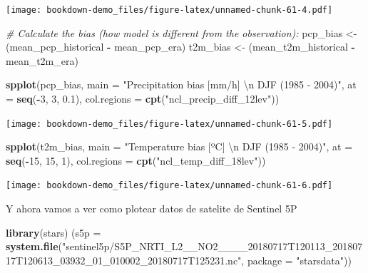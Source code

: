 \documentclass[]{book}
\newenvironment{Shaded}{\begin{snugshade}}{\end{snugshade}}
\newcommand{\CharTok}[1]{\textcolor[rgb]{0.31,0.60,0.02}{#1}}
\newcommand{\CommentTok}[1]{\textcolor[rgb]{0.56,0.35,0.01}{\textit{#1}}}
\newcommand{\DataTypeTok}[1]{\textcolor[rgb]{0.13,0.29,0.53}{#1}}
\newcommand{\DecValTok}[1]{\textcolor[rgb]{0.00,0.00,0.81}{#1}}
\newcommand{\FloatTok}[1]{\textcolor[rgb]{0.00,0.00,0.81}{#1}}
\newcommand{\KeywordTok}[1]{\textcolor[rgb]{0.13,0.29,0.53}{\textbf{#1}}}
\newcommand{\NormalTok}[1]{#1}
\newcommand{\OperatorTok}[1]{\textcolor[rgb]{0.81,0.36,0.00}{\textbf{#1}}}
\newcommand{\StringTok}[1]{\textcolor[rgb]{0.31,0.60,0.02}{#1}}
\begin{document}
\texttt{[image: bookdown-demo\_files/figure-latex/unnamed-chunk-61-4.pdf]}

\begin{Shaded}
\begin{Highlighting}[]
\CommentTok{# Calculate the bias (how model is different from the observation):}
\NormalTok{pcp_bias <-}\StringTok{ }\NormalTok{(mean_pcp_historical }\OperatorTok{-}\StringTok{ }\NormalTok{mean_pcp_era)}
\NormalTok{t2m_bias <-}\StringTok{ }\NormalTok{(mean_t2m_historical }\OperatorTok{-}\StringTok{ }\NormalTok{mean_t2m_era)}


\KeywordTok{spplot}\NormalTok{(pcp_bias,}
            \DataTypeTok{main =} \StringTok{"Precipitation bias [mm/h] }\CharTok{\textbackslash{}n}\StringTok{ DJF (1985 - 2004)"}\NormalTok{,}
            \DataTypeTok{at =} \KeywordTok{seq}\NormalTok{(}\OperatorTok{-}\DecValTok{3}\NormalTok{, }\DecValTok{3}\NormalTok{, }\FloatTok{0.1}\NormalTok{),}
            \DataTypeTok{col.regions =} \KeywordTok{cpt}\NormalTok{(}\StringTok{"ncl_precip_diff_12lev"}\NormalTok{))}
\end{Highlighting}
\end{Shaded}

\texttt{[image: bookdown-demo\_files/figure-latex/unnamed-chunk-61-5.pdf]}

\begin{Shaded}
\begin{Highlighting}[]
\KeywordTok{spplot}\NormalTok{(t2m_bias,}
            \DataTypeTok{main =} \StringTok{"Temperature bias [ºC] }\CharTok{\textbackslash{}n}\StringTok{ DJF (1985 - 2004)"}\NormalTok{,}
            \DataTypeTok{at =} \KeywordTok{seq}\NormalTok{(}\OperatorTok{-}\DecValTok{15}\NormalTok{, }\DecValTok{15}\NormalTok{, }\DecValTok{1}\NormalTok{),}
            \DataTypeTok{col.regions =} \KeywordTok{cpt}\NormalTok{(}\StringTok{"ncl_temp_diff_18lev"}\NormalTok{))}
\end{Highlighting}
\end{Shaded}

\texttt{[image: bookdown-demo\_files/figure-latex/unnamed-chunk-61-6.pdf]}

Y ahora vamos a ver como plotear datos de satelite de Sentinel 5P

\begin{Shaded}
\begin{Highlighting}[]
\KeywordTok{library}\NormalTok{(stars)}
\NormalTok{(}\DataTypeTok{s5p =} \KeywordTok{system.file}\NormalTok{(}\StringTok{"sentinel5p/S5P_NRTI_L2__NO2____20180717T120113_20180717T120613_03932_01_010002_20180717T125231.nc"}\NormalTok{, }\DataTypeTok{package =} \StringTok{"starsdata"}\NormalTok{))}
\end{Highlighting}
\end{Shaded}
\end{document}

